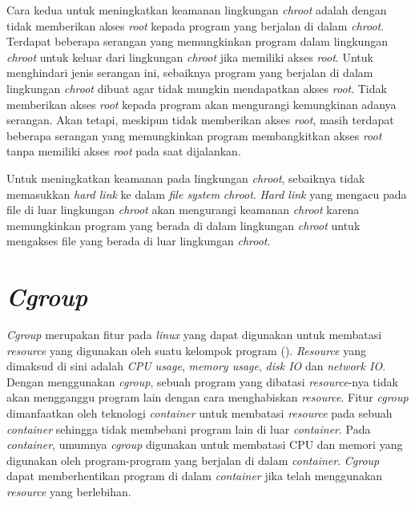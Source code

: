 \par Cara kedua untuk meningkatkan keamanan lingkungan \textit{chroot} adalah dengan tidak memberikan akses \textit{root} kepada program yang berjalan di dalam \textit{chroot}. Terdapat beberapa serangan yang memungkinkan program dalam lingkungan \textit{chroot} untuk keluar dari lingkungan \textit{chroot} jika memiliki akses \textit{root}. Untuk menghindari jenis serangan ini, sebaiknya program yang berjalan di dalam lingkungan \textit{chroot} dibuat agar tidak mungkin mendapatkan akses \textit{root}. Tidak memberikan akses \textit{root} kepada program akan mengurangi kemungkinan adanya serangan. Akan tetapi, meskipun tidak memberikan akses \textit{root}, masih terdapat beberapa serangan yang memungkinkan program membangkitkan akses \textit{root} tanpa memiliki akses \textit{root} pada saat dijalankan.

\par Untuk meningkatkan keamanan pada lingkungan \textit{chroot}, sebaiknya tidak memasukkan \textit{hard link} ke dalam \textit{file system} \textit{chroot}. \textit{Hard link} yang mengacu pada file di luar lingkungan \textit{chroot} akan mengurangi keamanan \textit{chroot} karena memungkinkan program yang berada di dalam lingkungan \textit{chroot} untuk mengakses file yang berada di luar lingkungan \textit{chroot}.

\section{\textit{Cgroup}}

\par \textit{Cgroup} merupakan fitur pada \textit{linux} yang dapat digunakan untuk membatasi \textit{resource} yang digunakan oleh suatu kelompok program (\cite{wfeltervmcontainer}). \textit{Resource} yang dimaksud di sini adalah \textit{CPU usage}, \textit{memory usage}, \textit{disk IO} dan \textit{network IO}. Dengan menggunakan \textit{cgroup}, sebuah program yang dibatasi \textit{resource}-nya tidak akan mengganggu program lain dengan cara menghabiskan \textit{resource}. Fitur \textit{cgroup} dimanfaatkan oleh teknologi \textit{container} untuk membatasi \textit{resource} pada sebuah \textit{container} sehingga tidak membebani program lain di luar \textit{container}. Pada \textit{container}, umumnya \textit{cgroup} digunakan untuk membatasi CPU dan memori yang digunakan oleh program-program yang berjalan di dalam \textit{container}. \textit{Cgroup} dapat memberhentikan program di dalam \textit{container} jika telah menggunakan \textit{resource} yang berlebihan.


